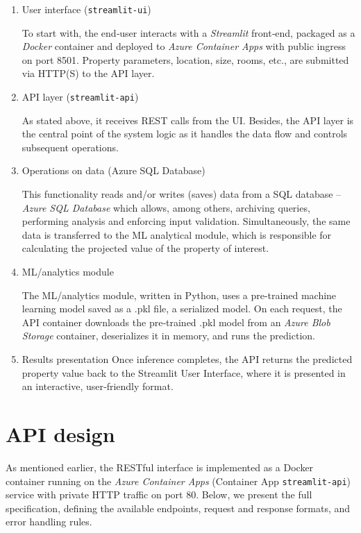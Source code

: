 \documentclass{article}
\begin{document}
\begin{enumerate}
    \item User interface (\texttt{streamlit-ui})

To start with, the end‑user interacts with a \emph{Streamlit} front‑end, packaged as a \emph{Docker} container and deployed to \emph{Azure Container Apps} with public ingress on port 8501. Property parameters, location, size, rooms, etc., are submitted via HTTP(S) to the API layer.
    
    \item API layer (\texttt{streamlit‑api})

As stated above, it receives REST calls from the UI. Besides, the API layer is the central point of the system logic as it handles the data flow and controls subsequent operations.


    \item Operations on data (Azure SQL Database)

This functionality reads and/or writes (saves) data from a SQL database -- \emph{Azure SQL Database} which allows, among others, archiving queries, performing analysis and enforcing input validation.
Simultaneously, the same data is transferred to the ML analytical module, which is responsible for calculating the projected value of the property of interest.

    \item ML/analytics module 

The ML/analytics module, written in Python, uses a pre-trained machine learning model saved as a .pkl file, a serialized model. On each request, the API container downloads the pre‑trained .pkl model from an \emph{Azure Blob Storage} container, deserializes it in memory, and runs the prediction.

    \item Results presentation
Once inference completes, the API returns the predicted property value back to the Streamlit User Interface, where it is presented in an interactive, user‑friendly format.


\end{enumerate}

\section{API design}

As mentioned earlier, the RESTful interface is implemented as a Docker container running on the \emph{Azure Container Apps} (Container App \texttt{streamlit‑api}) service with private HTTP traffic on port 80. Below, we present the full specification, defining the available endpoints, request and response formats, and error handling rules. 
\end{document}
